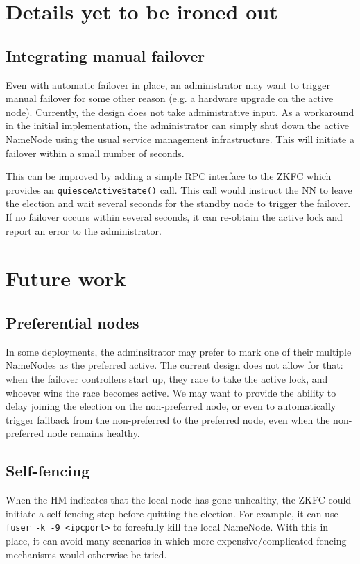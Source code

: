 \documentclass{article}
\begin{document}
\section{Details yet to be ironed out}

\subsection{Integrating manual failover}
Even with automatic failover in place, an administrator may want to trigger manual failover for some other reason (e.g. a hardware upgrade on the active node). Currently, the design does not take administrative input. As a workaround in the initial implementation, the administrator can simply shut down the active NameNode using the usual service management infrastructure. This will initiate a failover within a small number of seconds.

This can be improved by adding a simple RPC interface to the ZKFC which provides an {\tt quiesceActiveState()} call. This call would instruct the NN to leave the election and wait several seconds for the standby node to trigger the failover. If no failover occurs within several seconds, it can re-obtain the active lock and report an error to the administrator.

\section{Future work}

\subsection{Preferential nodes}
In some deployments, the adminsitrator may prefer to mark one of their multiple NameNodes as the preferred active. The current design does not allow for that: when the failover controllers start up, they race to take the active lock, and whoever wins the race becomes active. We may want to provide the ability to delay joining the election on the non-preferred node, or even to automatically trigger failback from the non-preferred to the preferred node, even when the non-preferred node remains healthy.

\subsection{Self-fencing}

When the HM indicates that the local node has gone unhealthy, the ZKFC could initiate a self-fencing step before quitting the election. For example, it can use {\tt fuser -k -9 <ipcport>} to forcefully kill the local NameNode. With this in place, it can avoid many scenarios in which more expensive/complicated fencing mechanisms would otherwise be tried.
\end{document}
